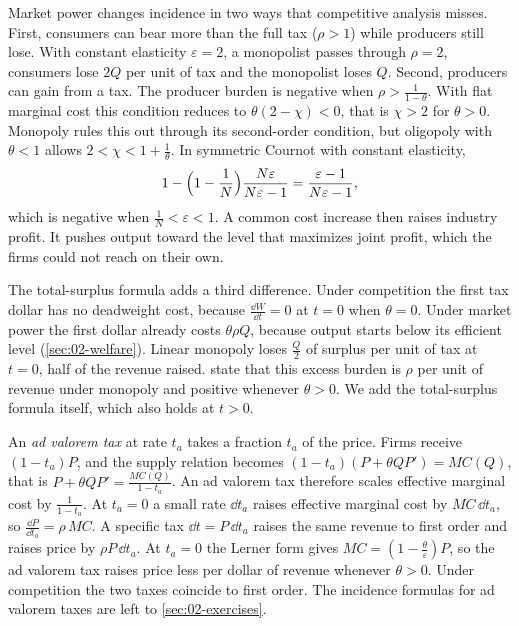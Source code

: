 Market power changes incidence in two ways that competitive analysis misses. First, consumers can bear more than
the full tax ($\rho > 1$) while producers still lose. With constant elasticity $\varepsilon = 2$, a monopolist
passes through $\rho = 2$, consumers lose $2Q$ per unit of tax and the monopolist loses $Q$. Second, producers
can gain from a tax. The producer burden is negative when $\rho > \frac{1}{1 - \theta}$. With flat marginal cost
this condition reduces to $\theta(2 - \chi) < 0$, that is $\chi > 2$ for $\theta > 0$. Monopoly rules this out
through its second-order condition, but oligopoly with $\theta < 1$ allows $2 < \chi < 1 + \frac{1}{\theta}$.
In symmetric Cournot with constant elasticity,
\begin{equation*}
1 - \Bigl(1 - \frac{1}{N}\Bigr)\frac{N\varepsilon}{N\varepsilon - 1} = \frac{\varepsilon - 1}{N\varepsilon - 1} ,
\end{equation*}
which is negative when $\frac{1}{N} < \varepsilon < 1$. A common cost increase then raises industry profit. It
pushes output toward the level that maximizes joint profit, which the firms could not reach on their own.

The total-surplus formula adds a third difference. Under competition the first tax dollar has no deadweight cost,
because $\frac{\dd W}{\dd t} = 0$ at $t = 0$ when $\theta = 0$. Under market power the first dollar already costs
$\theta\rho Q$, because output starts below its efficient level (\cref{sec:02-welfare}). Linear monopoly loses
$\frac{Q}{2}$ of surplus per unit of tax at $t = 0$, half of the revenue raised. \citet[pp.~537 and
546]{WeylFabinger2013} state that this excess burden is $\rho$ per unit of revenue under monopoly and positive
whenever $\theta > 0$. We add the total-surplus formula itself, which also holds at $t > 0$.

\begin{remark}\label{rem:02-pt-adval}
An \emph{ad valorem tax} at rate $t_a$ takes a fraction $t_a$ of the price. Firms receive $(1 - t_a)P$, and the
supply relation becomes $(1 - t_a)(P + \theta QP') = MC(Q)$, that is $P + \theta QP' = \frac{MC(Q)}{1 - t_a}$.
An ad valorem tax therefore scales effective marginal cost by $\frac{1}{1 - t_a}$. At $t_a = 0$ a small rate
$\dd t_a$ raises effective marginal cost by $MC\,\dd t_a$, so $\frac{\dd P}{\dd t_a} = \rho\, MC$. A specific tax
$\dd t = P\,\dd t_a$ raises the same revenue to first order and raises price by $\rho P\,\dd t_a$. At $t_a = 0$
the Lerner form gives $MC = (1 - \frac{\theta}{\varepsilon})P$, so the ad valorem tax raises price less per dollar
of revenue whenever $\theta > 0$. Under competition the two taxes coincide to first order. The incidence formulas for ad valorem taxes
are left to \cref{sec:02-exercises}.
\end{remark}

